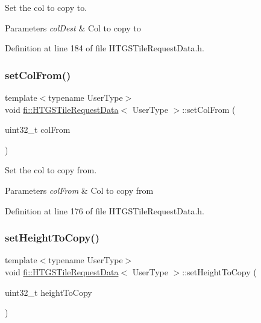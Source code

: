 Set the col to copy to. 


\begin{DoxyParams}{Parameters}
{\em col\+Dest} & Col to copy to \\
\hline
\end{DoxyParams}


Definition at line 184 of file H\+T\+G\+S\+Tile\+Request\+Data.\+h.

\mbox{\label{classfi_1_1HTGSTileRequestData_a25b7f6ea056b97f363fed4c47bc49434}} 
\subsubsection{\texorpdfstring{set\+Col\+From()}{setColFrom()}}
{\footnotesize\ttfamily template$<$typename User\+Type$>$ \\
void \hyperlink{classfi_1_1HTGSTileRequestData}{fi\+::\+H\+T\+G\+S\+Tile\+Request\+Data}$<$ User\+Type $>$\+::set\+Col\+From (\begin{DoxyParamCaption}\item[{uint32\+\_\+t}]{col\+From }\end{DoxyParamCaption})\hspace{0.3cm}{\ttfamily [inline]}}



Set the col to copy from. 


\begin{DoxyParams}{Parameters}
{\em col\+From} & Col to copy from \\
\hline
\end{DoxyParams}


Definition at line 176 of file H\+T\+G\+S\+Tile\+Request\+Data.\+h.

\mbox{\label{classfi_1_1HTGSTileRequestData_adbfdb22563f32bd615faebf5674327fd}} 
\subsubsection{\texorpdfstring{set\+Height\+To\+Copy()}{setHeightToCopy()}}
{\footnotesize\ttfamily template$<$typename User\+Type$>$ \\
void \hyperlink{classfi_1_1HTGSTileRequestData}{fi\+::\+H\+T\+G\+S\+Tile\+Request\+Data}$<$ User\+Type $>$\+::set\+Height\+To\+Copy (\begin{DoxyParamCaption}\item[{uint32\+\_\+t}]{height\+To\+Copy }\end{DoxyParamCaption})\hspace{0.3cm}{\ttfamily [inline]}}



